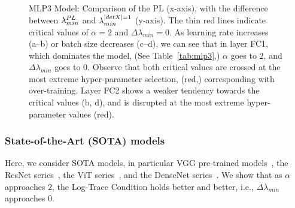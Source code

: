 \begin{figure}[t]
{        \label{fig:mlp3-detx-bs_search_fc2}
    }
    \caption{
            MLP3 Model: Comparison of the PL \ALPHA (x-axis), with the difference between $\lambda^{PL}_{min}$ and $\lambda^{\vert detX\vert=1}_{min}$ 
            (y-axis). The thin red lines indicate critical values of $\alpha=2$ and $\Delta \lambda_{min} = 0$. As 
            learning rate increases (a--b) or batch size decreases (c--d), we can see that in layer FC1, which dominates 
            the model, (See Table~\ref{tab:mlp3},) $\alpha$ goes to $2$, and $\Delta \lambda_{min}$ goes to $0$. Observe 
            that both critical values are crossed at the most extreme hyper-parameter selection, (red,) corresponding 
            with over-training. Layer FC2 shows a weaker tendency towards the critical values (b, d), and is disrupted 
            at the most extreme hyper-parameter values (red).
    }
 \label{fig:mlp3-detx-gap}
\end{figure}


\subsubsection{State-of-the-Art (SOTA) models}
\label{sxn:detx-sota}

Here, we consider SOTA models, 
in particular VGG pre-trained models~\cite{VGG14_TR}, the ResNet series~\cite{ResNet15_TR}, the ViT 
series~\cite{VIT20_TR}, and the DenseNet series~\cite{DenseNet17_TR}.
We show that as $\alpha$ approaches $2$, the Log-Trace Condition holds better and better, i.e., $\Delta\lambda_{min}$ 
approaches $0$.

